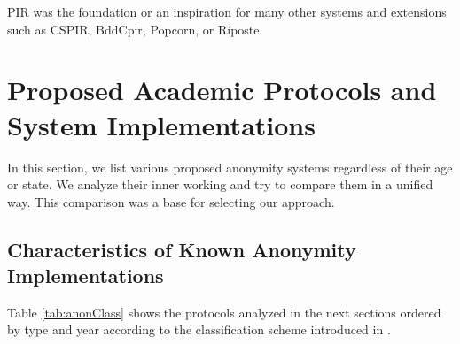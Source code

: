 PIR was the foundation or an inspiration for many other systems and extensions such as CSPIR\cite{lipmaa2009first}, BddCpir\cite{lipmaa2009first}, Popcorn\cite{gupta2016scalable}, or Riposte\cite{corrigan2015riposte}.

\chapter{Proposed Academic Protocols and System Implementations\label{sec:implSystems}}
In this section, we list various proposed anonymity systems regardless of their age or state. We analyze their inner working and try to compare them in a unified way. This comparison was a base for selecting our approach.


\section{Characteristics of Known Anonymity Implementations}
Table \ref{tab:anonClass} shows the protocols analyzed in the next sections ordered by type and year according to the classification scheme introduced in \cite{Shirazi2018}.

